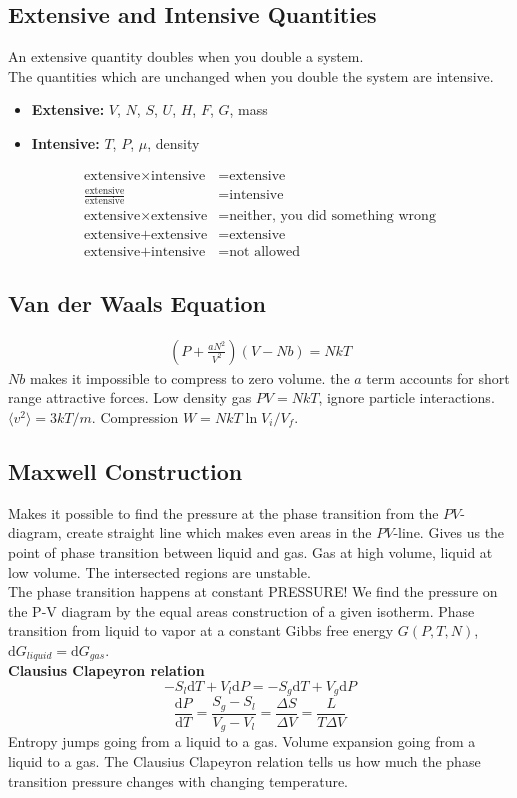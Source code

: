 \documentclass[a4paper, norsk, 8pt]{article}
\begin{document}
\begin{multicols*}{3}
\subsection*{\footnotesize  Extensive and Intensive Quantities}
An extensive quantity doubles when you double a system.\\
The quantities which are unchanged when you double the system are intensive.
\begin{itemize}
    \item \textbf{Extensive:} $V$, $N$, $S$, $U$, $H$, $F$, $G$, mass
    \item \textbf{Intensive:} $T$, $P$, $\mu$, density
\end{itemize}
\begin{align*}
    \text{extensive} \times \text{intensive} &= \text{extensive} \\
     \frac{\text{extensive}}{\text{extensive}} &= \text{intensive} \\
     \text{extensive} \times \text{extensive} &= \text{neither, you did something wrong} \\
     \text{extensive} + \text{extensive} &= \text{extensive} \\
     \text{extensive} + \text{intensive} &= \text{not allowed}
\end{align*}


\subsection*{\footnotesize  Van der Waals Equation}
\begin{align*}
    \left( P + \frac{aN^2}{V^2}\right)\left(V-Nb\right) = NkT
\end{align*}
$Nb$ makes it impossible to compress to zero volume. the $a$ term accounts for short range attractive forces.
Low density gas $PV=NkT$, ignore particle interactions. $\langle v^2 \rangle = 3kT/m$. Compression $W =NkT\ln{V_i/V_f}$.

\subsection*{\footnotesize Maxwell Construction}
Makes it possible to find the pressure at the phase transition from the $PV$-diagram, create straight line which makes even areas in the $PV$-line. Gives us the point of phase transition between liquid and gas. Gas at high volume, liquid at low volume. The intersected regions are unstable.\\
The phase transition happens at constant PRESSURE! We find the pressure on the P-V diagram by the equal areas construction of a given isotherm. Phase transition from liquid to vapor at a constant Gibbs free energy $G(P, T, N)$, $\mbox{d}G_{liquid} = \mbox{d}G_{gas}$.\\
\textbf{Clausius Clapeyron relation}
$$-S_l\mbox{d}T + V_l\mbox{d}P = -S_g\mbox{d}T+V_g\mbox{d}P $$
$$ \frac{\mbox{d}P}{\mbox{d}T} = \frac{S_g-S_l}{V_g-V_l} = \frac{\Delta S}{\Delta V} = \frac{L}{T\Delta V}$$
Entropy jumps going from a liquid to a gas. Volume expansion going from a liquid to a gas. The Clausius Clapeyron relation tells us how much the phase transition pressure changes with changing temperature.


\end{multicols*}
\end{document}
